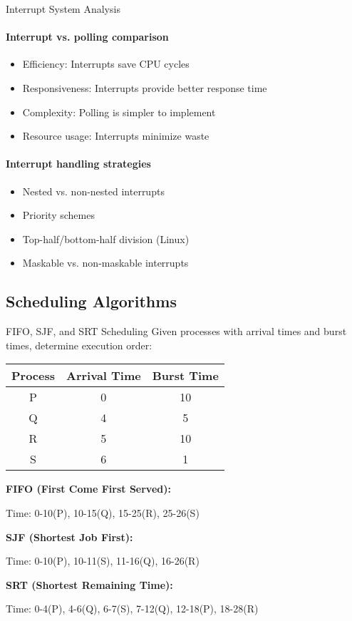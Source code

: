 \begin{KR}{Interrupt System Analysis}
    \paragraph{Interrupt vs. polling comparison}
    \begin{itemize}
        \item Efficiency: Interrupts save CPU cycles
        \item Responsiveness: Interrupts provide better response time
        \item Complexity: Polling is simpler to implement
        \item Resource usage: Interrupts minimize waste
    \end{itemize}
    
    \paragraph{Interrupt handling strategies}
    \begin{itemize}
        \item Nested vs. non-nested interrupts
        \item Priority schemes
        \item Top-half/bottom-half division (Linux)
        \item Maskable vs. non-maskable interrupts
    \end{itemize}
\end{KR}

\subsection{Scheduling Algorithms}

\begin{example2}{FIFO{,} SJF{,} and SRT Scheduling}
    Given processes with arrival times and burst times, determine execution order:
    
    \begin{tabular}{|c|c|c|}
        \hline
        Process & Arrival Time & Burst Time \\
        \hline
        P & 0 & 10 \\
        Q & 4 & 5 \\
        R & 5 & 10 \\
        S & 6 & 1 \\
        \hline
    \end{tabular}
    
    \tcblower
    
    \textbf{FIFO (First Come First Served):}
    
    Time: 0-10(P), 10-15(Q), 15-25(R), 25-26(S)
    
    \textbf{SJF (Shortest Job First):}
    
    Time: 0-10(P), 10-11(S), 11-16(Q), 16-26(R)
    
    \textbf{SRT (Shortest Remaining Time):}
    
    Time: 0-4(P), 4-6(Q), 6-7(S), 7-12(Q), 12-18(P), 18-28(R)
\end{example2}

